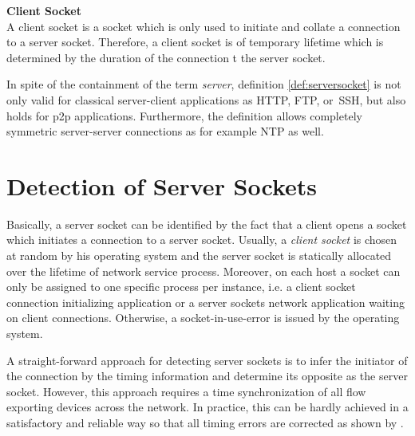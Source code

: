 \parbox{
\textwidth}{
\begin{defn}
	{\textbf{Client Socket}\\} A client socket is a socket which is only used to
	initiate and collate a connection to a server socket. Therefore, a client
	socket is of temporary lifetime which is determined by the duration of the
	connection t the server socket.
\end{defn}
}

In spite of the containment of the term \emph{server}, definition
\ref{def:serversocket} is not only valid for classical server-client
applications as \gls{HTTP}, \gls{FTP}, or \gls{SSH}, but also holds for
\gls{p2p} applications. Furthermore, the definition allows completely symmetric
server-server connections as for example \gls{NTP} as well.


\section{Detection of Server Sockets
\label{section:socket_detection}}

Basically, a \gls{server socket} can be identified by the fact that a client
opens a socket which initiates a connection to a \gls{server socket}. Usually,
a \emph{client socket} is chosen at random by his operating system and the
\gls{server socket} is statically allocated over the lifetime of network
service process. Moreover, on each host a socket can only be assigned to one
specific process per instance, i.e. a client socket connection initializing
application or a \glspl{server socket} network application waiting on client
connections. Otherwise, a socket-in-use-error is issued by the operating
system\citep{Schatzmann:Dissection}.

A straight-forward approach for detecting \glspl{server socket} is to infer the
initiator of the connection by the timing information and determine its opposite
as the \gls{server socket}. However, this approach requires a time
synchronization of all flow exporting devices across the network. In practice,
this can be hardly achieved in a satisfactory and reliable way so that all
timing errors are corrected as shown by \citet{Trammell}.

